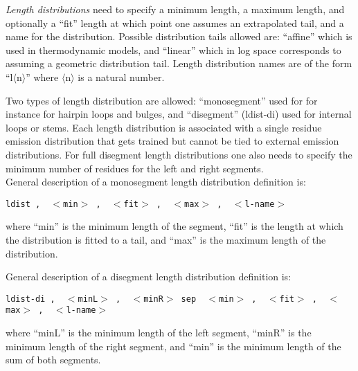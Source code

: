 
\textsl{Length distributions} need to specify a minimum length, a
maximum length, and optionally a ``fit'' length at which point one
assumes an extrapolated tail, and a name for the
distribution. Possible distribution tails allowed are: ``affine''
which is used in thermodynamic models, and ``linear'' which in log
space corresponds to assuming a geometric distribution tail. Length
distribution names are of the form ``l$\langle$n$\rangle$'' where
$\langle$n$\rangle$ is a natural number.

Two types of length distribution are allowed: ``monosegment'' used for
for instance for hairpin loops and bulges, and ``disegment''
(ldist-di) used for internal loops or stems.  Each length distribution
is associated with a single residue emission distribution that gets
trained but cannot be tied to external emission distributions. For
full disegment length distributions one also needs to specify the
minimum number of residues for the left and right segments.\\

\noindent
General description of a monosegment length distribution  definition is:\\

\noindent
\begin{footnotesize}
\texttt{ldist \sep\, $<$min$>$ \sep\, $<$fit$>$ \sep\, $<$max$>$ \sep\, $<$l-name$>$}\\
\end{footnotesize}

\noindent
where ``min'' is the minimum length of the segment, ``fit'' is the
length at which the distribution is fitted to a tail, and ``max'' is
the maximum length of the distribution.

\noindent
General description of a disegment length distribution  definition is:\\

\noindent
\begin{footnotesize}
\texttt{ldist-di \sep\, $<$minL$>$ \sep\, $<$minR$>$ sep\, $<$min$>$ \sep\, $<$fit$>$ \sep\, $<$max$>$ \sep\, $<$l-name$>$}\\
\end{footnotesize}

\noindent
where ``minL'' is the minimum length of the left segment, ``minR'' is the minimum length of the right segment, and
``min'' is the minimum length of the sum of both segments.\\

